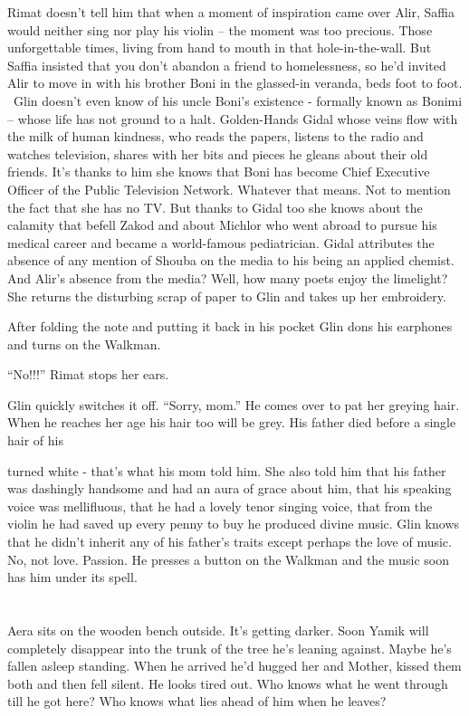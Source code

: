 \documentclass[twoside,11pt]{book}
\begin{document}
Rimat doesn't tell him that when a moment of inspiration came over
Alir, Saffia would neither sing nor play his violin -- the moment was too precious. Those unforgettable times, living
from hand to mouth in that hole-in-the-wall. But Saffia insisted that you don't abandon a friend to
homelessness, so he'd invited Alir to move in with his brother Boni in the
glassed-in veranda, beds foot to foot. \ Glin doesn't even know of his uncle Boni's existence - formally known as
Bonimi -- whose life has not ground to a halt. Golden-Hands Gidal whose veins flow with the milk of human kindness, who
reads the papers, listens to the radio and watches television, shares with her bits and pieces he gleans about their
old friends. It's thanks to him she knows that Boni has become Chief Executive Officer of the Public Television
Network. Whatever that means. Not to mention the fact that she has no TV. But thanks to Gidal too she knows about the
calamity that befell Zakod and about Michlor who went abroad to pursue his medical career and became a world-famous
pediatrician. Gidal attributes the absence of any mention of Shouba on the media to his being an applied chemist. And
Alir's absence from the media? Well, how many poets enjoy the limelight? She returns the disturbing
scrap of paper to Glin and takes up her embroidery.

After folding the note
and putting it back in his pocket Glin dons his earphones and turns
on the Walkman. 

``No!!!'' Rimat stops her ears. 

Glin quickly switches it off. ``Sorry, mom.'' He comes over to pat her
greying hair.  When he reaches her age his hair too will be grey.  His
father died before a single hair of his

turned white - that's what his mom told him. She also told him that
his father was dashingly handsome and had an aura of grace about him,
that his speaking voice was mellifluous, that he had a lovely tenor
singing voice, that from the violin he had saved up every penny to buy
he produced divine music. Glin knows that he didn't inherit any of his
father's traits except perhaps the love of music. No, not
love. Passion. He presses a button on the Walkman and the music soon
has him under its spell.


\chapter{}

Aera sits on the wooden bench
outside. It's getting darker.
Soon Yamik will completely disappear into the trunk of the tree he's
leaning against. Maybe he's fallen asleep standing. When he arrived he'd hugged her and Mother, kissed them both and
then fell silent. He looks tired out. Who knows what he went through till he got here? Who knows what lies ahead of him
when he leaves?
\end{document}
